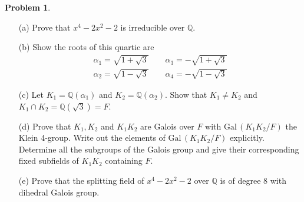 \documentclass{article}
\theoremstyle{definition}
\newtheorem{prob}{Problem}
\newcommand{\QQ}{\mathbb Q}
\newcommand{\Gal}{\text{Gal}\,}
\begin{document}
\setcounter{prob}{15}
\begin{prob}
	\begin{enumerate}
		\item[(a)] Prove that $x^4 - 2 x^2 - 2$ is irreducible over $\QQ$.

		\item[(b)] Show the roots of this quartic are 
			\[
				\begin{split}
					\alpha_1 = \sqrt{1 + \sqrt{3}} \qquad \alpha_3 = - \sqrt{1 + \sqrt{3}}\\
					\alpha_2 = \sqrt{1 - \sqrt{3}} \qquad \alpha_4 = - \sqrt{1 - \sqrt{3}}
				\end{split}
			\]
					
		\item[(c)] Let $K_1 = \QQ(\alpha_1)$ and $K_2 = \QQ(\alpha_2)$. 
			Show that $K_1 \neq K_2$ and $K_1 \cap K_2 = \QQ(\sqrt{3}) = F$.
			
		\item[(d)] Prove that $K_1, K_2$ and $K_1 K_2$ are Galois over $F$ with $\Gal(K_1 K_2/F)$ the Klein 4-group.
			Write out the elements of $\Gal(K_1 K_2/F)$ explicitly.
			Determine all the subgroups of the Galois group and give their corresponding fixed subfields of $K_1 K_2$ containing $F$.

		\item[(e)] Prove that the splitting field of $x^4 - 2 x^2 - 2$ over $\QQ$ is of degree 8 with dihedral Galois group.
	\end{enumerate}
\end{prob}
\end{document}
